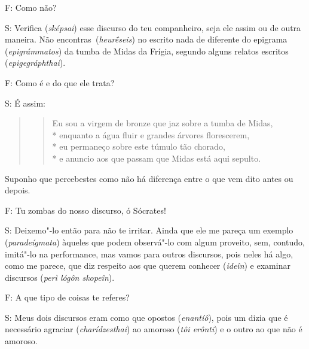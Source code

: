  

F: Como não?

 

S: Verifica (\emph{sképsai}) esse discurso do teu companheiro, seja ele
assim ou de outra maneira. Não encontras\emph{~}(\emph{heurḗseis}) no
escrito nada de diferente do epigrama (\emph{epigrámmatos}) da tumba de
Midas da Frígia, segundo alguns relatos escritos
(\emph{epigegráphthai}).

 

F: Como é e do que ele trata?

 

S: É assim:

 

\begin{quote}
\begin{verse}
Eu sou a virgem de bronze que jaz sobre a tumba de Midas,\\*
enquanto a água fluir e grandes árvores florescerem,\\*
eu permaneço sobre este túmulo tão chorado,\\*
e anuncio aos que passam que Midas está aqui sepulto.\\
\end{verse}
\end{quote}

 

Suponho que percebestes como não há diferença entre o que vem dito antes
ou depois.

\bekker{[264e]} F: Tu zombas do nosso discurso, ó Sócrates!

 

S: Deixemo"-lo então para não te irritar. Ainda que ele me pareça um
exemplo (\emph{paradeígmata}) àqueles que podem observá"-lo com algum
proveito, sem, contudo, imitá"-lo na performance, mas vamos para outros
discursos, pois neles há algo, como me parece, que diz respeito aos que
querem conhecer (\emph{ideîn}) e examinar discursos (\emph{perì lógôn
skopeîn}).

 

\bekker{[265a]} F: A que tipo de coisas te referes?

 

S: Meus dois discursos eram como que opostos (\emph{enantíô}), pois um
dizia que é necessário agraciar (\emph{charídzesthai}) ao amoroso
(\emph{tôi erônti}) e o outro ao que não é amoroso.

 

